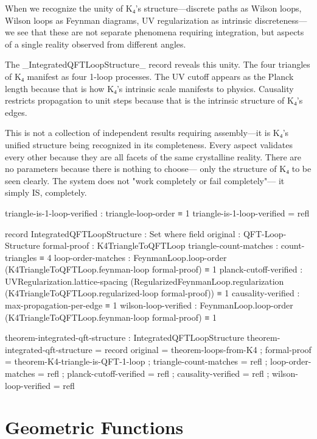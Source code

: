\documentclass[11pt,a4paper]{book}
\begin{document}
When we recognize the unity of K₄'s structure—discrete paths as Wilson loops, Wilson loops as 
Feynman diagrams, UV regularization as intrinsic discreteness—we see that these are not separate 
phenomena requiring integration, but aspects of a single reality observed from different angles.

The \_IntegratedQFTLoopStructure\_ record reveals this unity. The four triangles of K₄ manifest as 
four 1-loop processes. The UV cutoff appears as the Planck length because that is how K₄'s intrinsic 
scale manifests to physics. Causality restricts propagation to unit steps because that is the 
intrinsic structure of K₄'s edges.

This is not a collection of independent results requiring assembly—it is K₄'s unified structure 
being recognized in its completeness. Every aspect validates every other because they are all 
facets of the same crystalline reality. There are no parameters because there is nothing to choose—
only the structure of K₄ to be seen clearly. The system does not "work completely or fail completely"—
it simply IS, completely.

\begin{code}
triangle-is-1-loop-verified : triangle-loop-order ≡ 1
triangle-is-1-loop-verified = refl

record IntegratedQFTLoopStructure : Set where
  field
    original : QFT-Loop-Structure
    formal-proof : K4TriangleToQFTLoop
    triangle-count-matches : count-triangles ≡ 4
    loop-order-matches : FeynmanLoop.loop-order (K4TriangleToQFTLoop.feynman-loop formal-proof) ≡ 1
    planck-cutoff-verified : UVRegularization.lattice-spacing 
                           (RegularizedFeynmanLoop.regularization 
                             (K4TriangleToQFTLoop.regularized-loop formal-proof)) ≡ 1
    causality-verified : max-propagation-per-edge ≡ 1
    wilson-loop-verified : FeynmanLoop.loop-order (K4TriangleToQFTLoop.feynman-loop formal-proof) ≡ 1

theorem-integrated-qft-structure : IntegratedQFTLoopStructure
theorem-integrated-qft-structure = record
  { original = theorem-loops-from-K4
  ; formal-proof = theorem-K4-triangle-is-QFT-1-loop
  ; triangle-count-matches = refl
  ; loop-order-matches = refl
  ; planck-cutoff-verified = refl
  ; causality-verified = refl
  ; wilson-loop-verified = refl
  }
\end{code}

\chapter{Geometric Functions}
\label{chap:geometric-functions}
\end{document}
